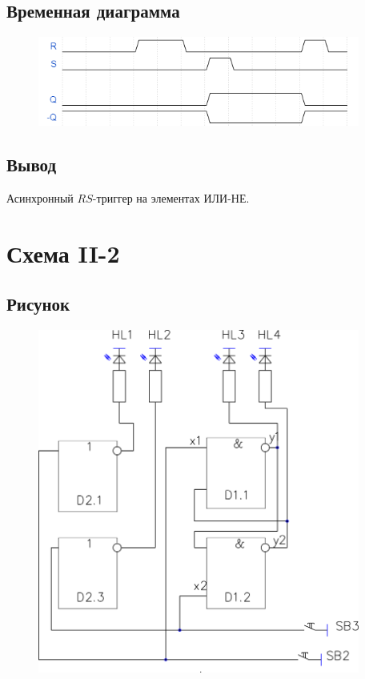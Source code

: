 \documentclass[a4paper]{article}
\begin{document}
\subsection{Временная диаграмма}
\begin{figure}[H]
    \centering
    \includegraphics[width=300pt]{d1.png}
\end{figure}


\subsection{Вывод}
Асинхронный $RS$-триггер на элементах ИЛИ-НЕ.

\section{Схема II-2}

\subsection{Рисунок}
\begin{figure}[H]
    \centering
    \includegraphics[width=300pt]{s2.png}
\end{figure}
\end{document}
